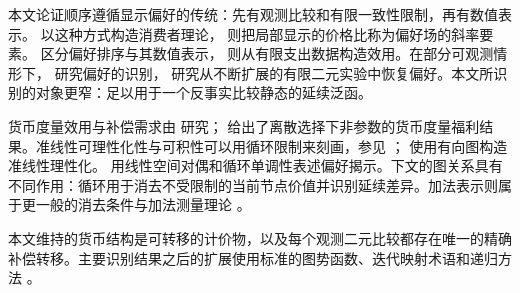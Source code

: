 本文论证顺序遵循显示偏好的传统：先有观测比较和有限一致性限制，再有数值表示。\citet{samuelson1938,samuelson1948} 以这种方式构造消费者理论，\citet{samuelson1950} 则把局部显示的价格比称为偏好场的斜率要素。\citet{debreu1954} 区分偏好排序与其数值表示，\citet{afriat1967} 则从有限支出数据构造效用。在部分可观测情形下，\citet{gorno2019} 研究偏好的识别，\citet{chambersetal2021} 研究从不断扩展的有限二元实验中恢复偏好。本文所识别的对象更窄：足以用于一个反事实比较静态的延续泛函。

货币度量效用与补偿需求由 \citet{fuchsseliger1989,fuchsseliger1990} 研究；\citet{bhattacharya2015} 给出了离散选择下非参数的货币度量福利结果。准线性可理性化性与可积性可以用循环限制来刻画，参见 \citet{rochet1987,browncalsamiglia2007,nockeschutz2017}；\citet{castillofreer2023} 使用有向图构造准线性理性化。\citet{makowskiostroy2013} 用线性空间对偶和循环单调性表述偏好揭示。下文的图关系具有不同作用：循环用于消去不受限制的当前节点价值并识别延续差异。加法表示则属于更一般的消去条件与加法测量理论 \citep{kraftprattseidenberg1959,scott1964,doignonfalmagne1974,fishburnetal1988,fishburn2001}。

本文维持的货币结构是可转移的计价物，以及每个观测二元比较都存在唯一的精确补偿转移。主要识别结果之后的扩展使用标准的图势函数、迭代映射术语和递归方法 \citep{elaydi2005,kuznetsov2004,stokeylucasprescott1989}。

